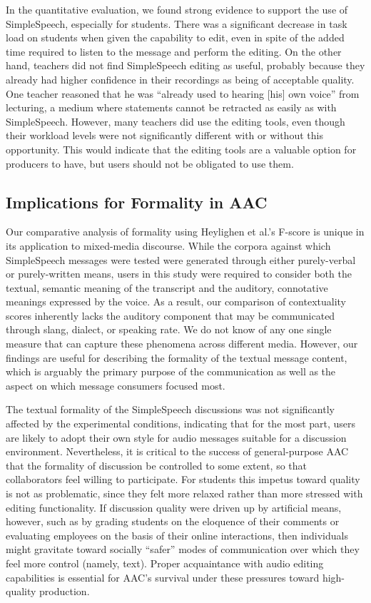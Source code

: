 In the quantitative evaluation, we found strong evidence to support the use of SimpleSpeech, especially for students.
There was a significant decrease in task load on students when given the capability to edit, even in spite of the added time required to listen to the message and perform the editing. 
On the other hand, teachers did not find SimpleSpeech editing as useful, probably because they already had higher confidence in their recordings as being of acceptable quality. 
One teacher reasoned that he was ``already used to hearing [his] own voice'' from lecturing, a medium where statements cannot be retracted as easily as with SimpleSpeech.
However, many teachers did use the editing tools, even though their workload levels were not significantly different with or without this opportunity.
This would indicate that the editing tools are a valuable option for producers to have, but users should not be obligated to use them.

\subsection{Implications for Formality in AAC}
Our comparative analysis of formality using Heylighen et al.'s F-score \cite{heylighen} is unique in its application to mixed-media discourse.
While the corpora against which SimpleSpeech messages were tested were generated through either purely-verbal or purely-written means, users in this study were required to consider both the textual, semantic meaning of the transcript and the auditory, connotative meanings expressed by the voice.
As a result, our comparison of contextuality scores inherently lacks the auditory component that may be communicated through slang, dialect, or speaking rate.
We do not know of any one single measure that can capture these phenomena across different media.
However, our findings are useful for describing the formality of the textual message content, which is arguably the primary purpose of the communication as well as the aspect on which message consumers focused most.

The textual formality of the SimpleSpeech discussions was not significantly affected by the experimental conditions, indicating that for the most part, users are likely to adopt their own style for audio messages suitable for a discussion environment.
Nevertheless, it is critical to the success of general-purpose AAC that the formality of discussion be controlled to some extent, so that collaborators feel willing to participate.
For students this impetus toward quality is not as problematic, since they felt more relaxed rather than more stressed with editing functionality.
If discussion quality were driven up by artificial means, however, such as by grading students on the eloquence of their comments or evaluating employees on the basis of their online interactions, then individuals might gravitate toward socially ``safer'' modes of communication over which they feel more control (namely, text).
Proper acquaintance with audio editing capabilities is essential for AAC's survival under these pressures toward high-quality production.

